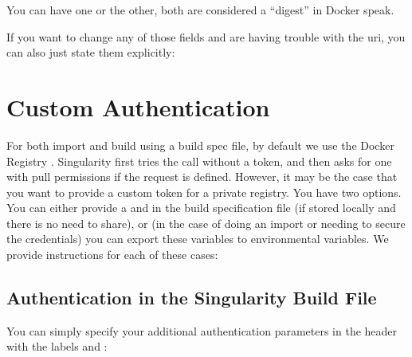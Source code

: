 \documentclass[letterpaper,10pt,english]{sphinxmanual}
\begin{document}
%
\begin{sphinxVerbatim}[commandchars=\\\{\}]
\end{sphinxVerbatim}

You can have one or the other, both are considered a “digest” in
Docker speak.

If you want to change any of those fields and are having trouble with
the uri, you can also just state them explicitly:

%
\begin{sphinxVerbatim}[commandchars=\\\{\}]
 

 

 

 
\end{sphinxVerbatim}


\section{Custom Authentication}
\label{\detokenize{singularity_and_docker:custom-authentication}}
For both import and build using a build spec file, by default we use
the Docker Registry  . Singularity first tries the call without a
token, and then asks for one with pull permissions if the request is
defined. However, it may be the case that you want to provide a custom
token for a private registry. You have two options. You can either
provide a  and  in the build specification file (if stored locally and
there is no need to share), or (in the case of doing an import or
needing to secure the credentials) you can export these variables to
environmental variables. We provide instructions for each of these
cases:


\subsection{Authentication in the Singularity Build File}
\label{\detokenize{singularity_and_docker:authentication-in-the-singularity-build-file}}
You can simply specify your additional authentication parameters in the
header with the labels  and  :
\end{document}
